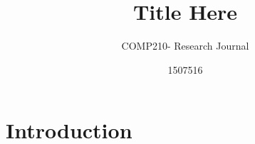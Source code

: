 \documentclass{scrartcl}
\title{Title Here}
\subtitle{COMP210- Research Journal}
\author{1507516}
\begin{document}
\maketitle

\abstract{}

\section{Introduction}





\end{document}
